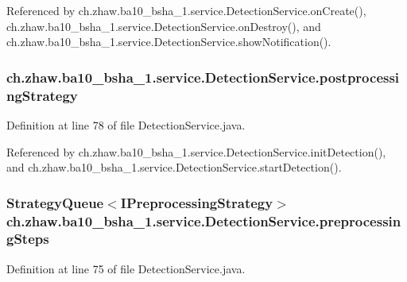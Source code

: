 Referenced by ch.zhaw.ba10\_\-bsha\_\-1.service.DetectionService.onCreate(), ch.zhaw.ba10\_\-bsha\_\-1.service.DetectionService.onDestroy(), and ch.zhaw.ba10\_\-bsha\_\-1.service.DetectionService.showNotification().\hypertarget{classch_1_1zhaw_1_1ba10__bsha__1_1_1service_1_1DetectionService_addd3104ced0625818552e1c6459269ec}{
\subsubsection[{postprocessingStrategy}]{ {\bf ch.zhaw.ba10\_\-bsha\_\-1.service.DetectionService.postprocessingStrategy}}}
\label{classch_1_1zhaw_1_1ba10__bsha__1_1_1service_1_1DetectionService_addd3104ced0625818552e1c6459269ec}


Definition at line 78 of file DetectionService.java.

Referenced by ch.zhaw.ba10\_\-bsha\_\-1.service.DetectionService.initDetection(), and ch.zhaw.ba10\_\-bsha\_\-1.service.DetectionService.startDetection().\hypertarget{classch_1_1zhaw_1_1ba10__bsha__1_1_1service_1_1DetectionService_a1cf989116feef3dca971827a4d16e56b}{
\subsubsection[{preprocessingSteps}]{\setlength{\rightskip}{0pt plus 5cm}StrategyQueue$<${\bf IPreprocessingStrategy}$>$ {\bf ch.zhaw.ba10\_\-bsha\_\-1.service.DetectionService.preprocessingSteps}}}
\label{classch_1_1zhaw_1_1ba10__bsha__1_1_1service_1_1DetectionService_a1cf989116feef3dca971827a4d16e56b}


Definition at line 75 of file DetectionService.java.

